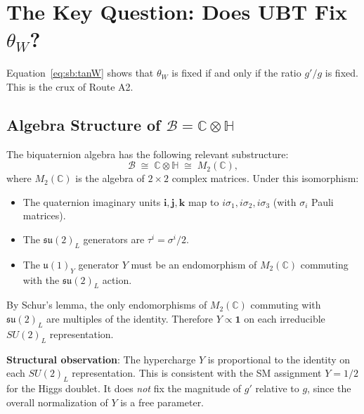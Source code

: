 \documentclass[12pt,a4paper]{article}
\theoremstyle{definition}
\theoremstyle{remark}
\begin{document}
\section{The Key Question: Does UBT Fix $\theta_W$?}
\label{sec:sb:fixing}

Equation~\eqref{eq:sb:tanW} shows that $\theta_W$ is fixed if and only if
the ratio $g'/g$ is fixed.  This is the crux of Route A2.

\subsection{Algebra Structure of $\mathcal{B} = \mathbb{C}\otimes\mathbb{H}$}

The biquaternion algebra has the following relevant substructure:
\begin{equation}
  \mathcal{B} \;\cong\; \mathbb{C} \otimes \mathbb{H}
  \;\cong\; M_2(\mathbb{C}),
  \label{eq:sb:B_iso}
\end{equation}
where $M_2(\mathbb{C})$ is the algebra of $2\times 2$ complex matrices.
Under this isomorphism:
\begin{itemize}
  \item The quaternion imaginary units $\mathbf{i}, \mathbf{j}, \mathbf{k}$ map to
        $i\sigma_1, i\sigma_2, i\sigma_3$ (with $\sigma_i$ Pauli matrices).
  \item The $\mathfrak{su}(2)_L$ generators are $\tau^i = \sigma^i/2$.
  \item The $\mathfrak{u}(1)_Y$ generator $Y$ must be an endomorphism of $M_2(\mathbb{C})$
        commuting with the $\mathfrak{su}(2)_L$ action.
\end{itemize}

By Schur's lemma, the only endomorphisms of $M_2(\mathbb{C})$ commuting with
$\mathfrak{su}(2)_L$ are multiples of the identity.  Therefore $Y \propto \mathbf{1}$
on each irreducible $SU(2)_L$ representation.

\begin{insightbox}
\textbf{Structural observation}: The hypercharge $Y$ is proportional to the identity
on each $SU(2)_L$ representation.  This is consistent with the SM assignment
$Y = 1/2$ for the Higgs doublet.  It does \emph{not} fix the magnitude of $g'$
relative to $g$, since the overall normalization of $Y$ is a free parameter.
\end{insightbox}
\end{document}
